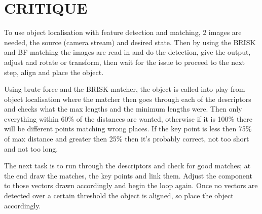 \documentclass[a4paper, 10pt]{IEEEconf}
\begin{document}
\section{CRITIQUE}
To use object localisation with feature detection and matching, 2 images are needed, the source (camera stream) and desired state. Then by using the BRISK and BF matching the images are read in and do the detection, give the output, adjust and rotate or transform, then wait for the issue to proceed to the next step, align and place the object.

Using brute force and the BRISK matcher, the object is called into play from object localisation where the matcher then goes through each of the descriptors and checks what the max lengths and the minimum lengths were. Then only everything within 60\% of the distances are wanted, otherwise if it is 100\% there will be different points matching wrong places. If the key point is less then 75\% of max distance and greater then 25\% then it's probably correct, not too short and not too long.

The next task is to run through the descriptors and check for good matches; at the end draw the matches, the key points and link them. Adjust the component to those vectors drawn accordingly and begin the loop again. Once no vectors are detected over a certain threshold the object is aligned, so place the object accordingly.

\end{document}
